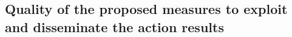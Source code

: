 \documentclass[a4paper,11pt]{article}
\begin{document}
%                

\subsection{Quality of the proposed measures to exploit and disseminate the action results }

% 

\end{document}

